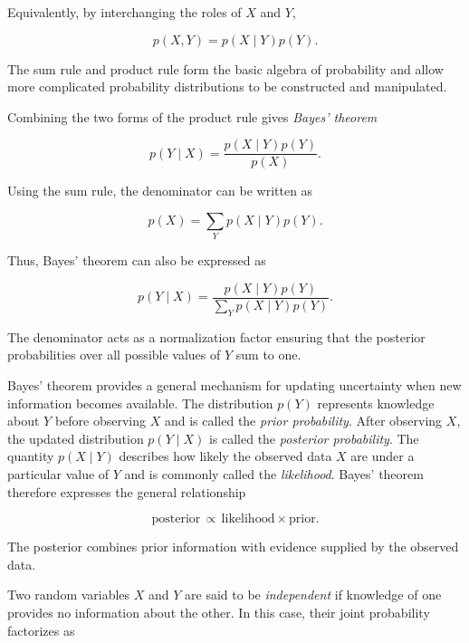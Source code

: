\documentclass[10pt,twocolumn]{memoir}
\begin{document}
Equivalently, by interchanging the roles of $X$ and $Y$,

\begin{equation}
    p(X,Y) = p(X \mid Y)p(Y).
\label{eq:product_rule_2}
\end{equation}

The sum rule and product rule form the basic algebra of probability and allow more complicated probability distributions to be constructed and manipulated.

Combining the two forms of the product rule gives \textit{Bayes' theorem}

\begin{equation}
    p(Y \mid X) = \frac{p(X \mid Y)p(Y)}{p(X)}.
\end{equation}

Using the sum rule, the denominator can be written as

\begin{equation}
    p(X) = \sum_Y p(X \mid Y)p(Y).
\end{equation}

Thus, Bayes' theorem can also be expressed as

\begin{equation}
    p(Y \mid X) = \frac{p(X \mid Y)p(Y)}{\sum_Y p(X \mid Y)p(Y)}.
\end{equation}

The denominator acts as a normalization factor ensuring that the posterior probabilities over all possible values of $Y$ sum to one.

Bayes' theorem provides a general mechanism for updating uncertainty when new information becomes available. The distribution $p(Y)$ represents knowledge about $Y$ before observing $X$ and is called the \textit{prior probability}. After observing $X$, the updated distribution $p(Y \mid X)$ is called the \textit{posterior probability}. The quantity $p(X \mid Y)$ describes how likely the observed data $X$ are under a particular value of $Y$ and is commonly called the \textit{likelihood}. Bayes' theorem therefore expresses the general relationship

\begin{equation}
    \mathrm{posterior}\,\propto\,\mathrm{likelihood}\times\mathrm{prior}.
\end{equation}

The posterior combines prior information with evidence supplied by the observed data.

Two random variables $X$ and $Y$ are said to be \textit{independent} if knowledge of one provides no information about the other. In this case, their joint probability factorizes as
\end{document}
